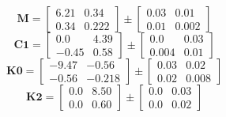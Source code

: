 \documentclass[../../report/parameterReport.tex]{subfiles}
\begin{document}
\begin{equation}
\mathbf{M}=
\left[
\begin{array}{rr}
    6.21 & 0.34\\
    0.34 & 0.222
\end{array}
\right]
\pm
\left[
\begin{array}{rr}
    0.03 & 0.01\\
    0.01 & 0.002
\end{array}
\right]
\label{eq:M}
\end{equation}
\begin{equation}
\mathbf{C1}=
\left[
\begin{array}{rr}
    0.0 & 4.39\\
    -0.45 & 0.58
\end{array}
\right]
\pm
\left[
\begin{array}{rr}
    0.0 & 0.03\\
    0.004 & 0.01
\end{array}
\right]
\label{eq:C1}
\end{equation}
\begin{equation}
\mathbf{K0}=
\left[
\begin{array}{rr}
    -9.47 & -0.56\\
    -0.56 & -0.218
\end{array}
\right]
\pm
\left[
\begin{array}{rr}
    0.03 & 0.02\\
    0.02 & 0.008
\end{array}
\right]
\label{eq:K0}
\end{equation}
\begin{equation}
\mathbf{K2}=
\left[
\begin{array}{rr}
    0.0 & 8.50\\
    0.0 & 0.60
\end{array}
\right]
\pm
\left[
\begin{array}{rr}
    0.0 & 0.03\\
    0.0 & 0.02
\end{array}
\right]
\label{eq:K2}
\end{equation}
\end{document}
